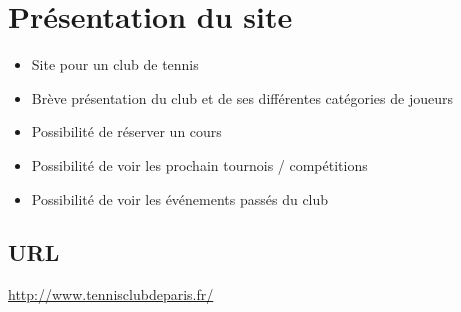 \documentclass{article}[12pt]
\begin{document}


\tableofcontents%
\newpage


\section{Présentation du site}
\begin{itemize}
	\item Site pour un club de tennis
    \item Brève présentation du club et de ses différentes catégories de joueurs
    \item Possibilité de réserver un cours
    \item Possibilité de voir les prochain tournois / compétitions
    \item Possibilité de voir les événements passés du club
\end{itemize}
\subsection{URL}
\url{http://www.tennisclubdeparis.fr/}
\end{document}
